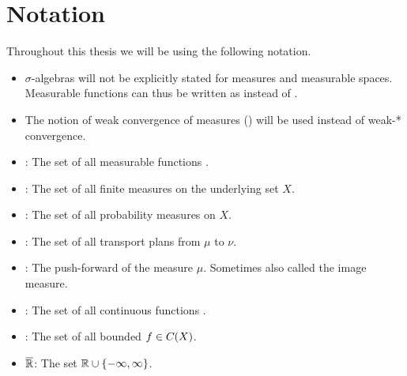 \chapter*{Notation}

Throughout this thesis we will be using the following notation.

\begin{itemize}
	\item $\sigma$-algebras will not be explicitly stated for measures and measurable spaces. Measurable functions can thus be written as  instead of .
	\item The notion of weak convergence of measures () will be used instead of weak-* convergence.
	\item {}: The set of all measurable functions .
	\item {}: The set of all finite measures on the underlying set $X$.
	\item {}: The set of all probability measures on $X$.
	\item \TP{\mu}{\nu}: The set of all transport plans from $\mu$ to $\nu$.
	\item \push{\mu}: The push-forward of the measure $\mu$. Sometimes also called the image measure.
	\item {}: The set of all continuous functions .
	\item {}: The set of all bounded $f \in C_{}(X)$.
	\item $\overline{\mathbb{R}}$: The set $\mathbb{R} \cup \{ -\infty, \infty \}$.
\end{itemize}
